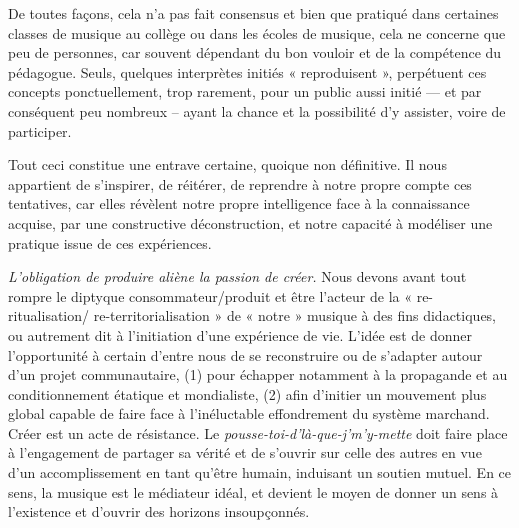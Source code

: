 \documentclass{article}
\begin{document}
De toutes façons, cela n’a pas fait consensus et bien que pratiqué dans certaines classes de musique au collège ou dans les écoles de musique, cela ne concerne que peu de personnes, car souvent dépendant du bon vouloir et de la compétence du pédagogue. Seuls, quelques interprètes initiés « reproduisent », perpétuent  ces concepts ponctuellement, trop rarement, pour un public aussi initié — et par conséquent peu nombreux -- ayant la chance et la possibilité d’y assister, voire de participer.

Tout ceci constitue une entrave certaine, quoique non définitive. Il nous appartient de s’inspirer, de réitérer, de reprendre à notre propre compte ces tentatives, car elles révèlent notre propre intelligence face à la connaissance acquise, par une constructive déconstruction, et notre capacité à modéliser une pratique issue de ces expériences.

\bigskip

\textit{L’obligation de produire aliène la passion de créer. 
}%
Nous devons avant tout rompre le diptyque consommateur/produit et être l'acteur de la « re-ritualisation/ re-territorialisation » de « notre » musique à des fins didactiques, ou autrement dit à l'initiation d'une expérience de vie.
%
L’idée est de donner l’opportunité à certain d’entre nous de se reconstruire ou de s’adapter autour d’un projet communautaire, (1) pour échapper notamment à la propagande et au conditionnement étatique et mondialiste, (2) afin d’initier un mouvement plus global capable de faire face à l’inéluctable effondrement du système marchand. Créer est un acte de résistance. Le \textit{pousse-toi-d'là-que-j'm'y-mette} doit faire place à l'engagement de partager sa vérité et de s'ouvrir sur celle des autres en vue d'un accomplissement en tant qu'être humain, induisant un soutien mutuel. En ce sens, la musique est le médiateur idéal, et devient le moyen de donner un sens à l’existence et d'ouvrir des horizons insoupçonnés. 


\bigskip
\end{document}
